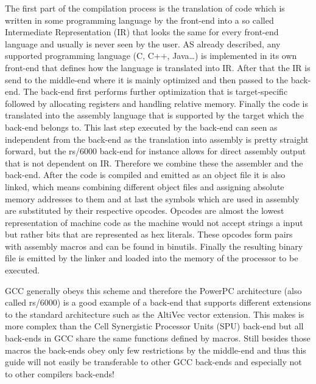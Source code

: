 The first part of the compilation process is the translation of code which is written in some programming language by the front-end into a so called Intermediate Representation (IR) that looks the same for every front-end language and usually is never seen by the user. AS already described, any supported programming language (C, C++, Java…) is implemented in its own front-end that defines how the language is translated into IR. After that the IR is send to the middle-end where it is mainly optimized and then passed to the back-end. The back-end first performs further optimization that is target-specific followed by allocating registers and handling relative memory. Finally the code is translated into the assembly language that is supported by the target which the back-end belongs to.
This last step executed by the back-end can seen as independent from the back-end as the translation into assembly is pretty straight forward, but the rs/6000 back-end for instance allows for direct assembly output that is not dependent on IR. Therefore we combine these the assembler and the back-end.
After the code is compiled and emitted as an object file it is also linked, which means combining different object files and assigning absolute memory addresses to them and at last the symbols which are used in assembly are substituted by their respective opcodes. Opcodes are almost the lowest representation of machine code as the machine would not accept strings a input but rather bits that are represented as hex literals. These opcodes form pairs with assembly macros and can be found in binutils. Finally the resulting binary file is emitted by the linker and loaded into the memory of the processor to be executed.

GCC generally obeys this scheme and therefore the PowerPC architecture (also called rs/6000) is a good example of a back-end that supports different extensions to the standard architecture such as the AltiVec vector extension. This makes is more complex than the Cell Synergistic Processor Units (SPU) back-end but all back-ends in GCC share the same functions defined by macros. Still besides those macros the back-ends obey only few restrictions by the middle-end and thus this guide will not easily be transferable to other GCC back-ends and especially not to other compilers back-ends!
